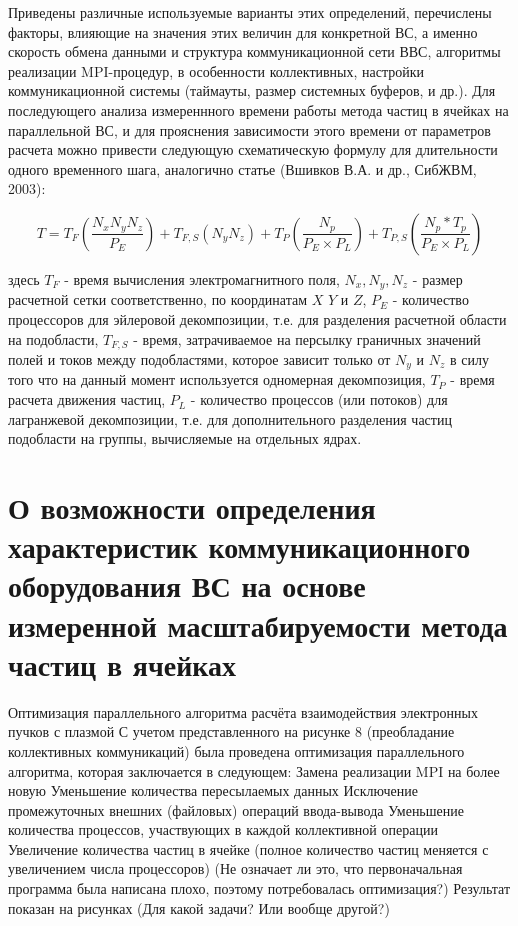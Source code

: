 			Приведены различные используемые варианты этих определений, перечислены факторы, влияющие на  значения этих величин для конкретной ВС, а именно скорость обмена данными и структура коммуникационной сети ВВС, алгоритмы реализации MPI-процедур, в особенности коллективных, настройки коммуникационной системы (таймауты, размер системных буферов, и др.).
			Для последующего анализа измереннного времени работы метода частиц в ячейках на параллельной ВС, и для прояснения зависимости этого времени от параметров расчета можно привести следующую схематическую формулу для длительности одного временного шага, аналогично статье (Вшивков В.А. и др., СибЖВМ, 2003):
			
			\begin{equation}
			\label{PIC-timestep}
			T=T_{F} \left ( \frac{N_x N_y N_z }{P_E}\right )+ T_{F,S}\left (N_y N_z\right ) + T_P\left(\frac{N_p}{P_E\times P_L}\right) +T_{P,S}\left (\frac{N_p*T_p}{P_E\times P_L}\right)
		\end{equation}
			 
		здесь $T_{F}$ - время вычисления электромагнитного поля, $N_x, N_y, N_z$ - размер расчетной сетки соответственно, по координатам $X$ $Y$ и $Z$, $P_E$ - количество процессоров для эйлеровой декомпозиции, т.е. для разделения расчетной области на подобласти, $T_{F,S}$ - время, затрачиваемое на персылку граничных значений полей и токов между подобластями, которое зависит только от $N_y$ и $N_z$ в силу того что на данный момент используется одномерная декомпозиция,  $T_P$ - время расчета движения частиц, $P_L$ - количество процессов (или потоков) для лагранжевой декомпозиции, т.е. для дополнительного разделения частиц подобласти на группы, вычисляемые на отдельных ядрах.
		
	
	    \section{О возможности определения характеристик коммуникационного оборудования ВС на основе измеренной масштабируемости метода частиц в ячейках}
	    
	    Оптимизация параллельного алгоритма расчёта взаимодействия электронных пучков с плазмой
	    С учетом представленного на рисунке 8 (преобладание коллективных коммуникаций) была проведена оптимизация параллельного алгоритма, которая заключается в следующем:
	    Замена реализации MPI на более новую
	    Уменьшение количества пересылаемых данных
	    Исключение промежуточных внешних (файловых) операций ввода-вывода
	    Уменьшение количества процессов, участвующих в каждой коллективной операции
	    Увеличение количества частиц в ячейке (полное количество частиц меняется с увеличением числа процессоров)
	    (Не означает ли это, что первоначальная программа была написана плохо, поэтому потребовалась оптимизация?)
	    Результат показан на рисунках (Для какой задачи? Или вообще другой?)
	    
